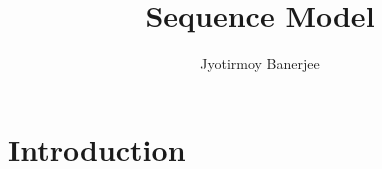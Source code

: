\documentclass{article}
\title{Sequence Model}
\author{Jyotirmoy Banerjee}
\begin{document}
\maketitle


\section{Introduction}
\end{document}

